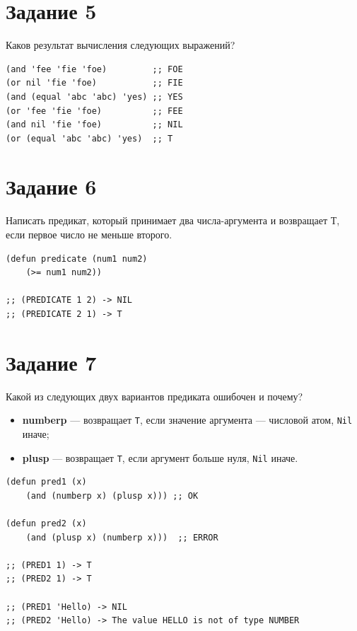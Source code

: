 \documentclass[a4paper,14pt, unknownkeysallowed]{extreport}
\begin{document}
\section{Задание 5}

Каков результат вычисления следующих выражений?

\begin{center}
\captionsetup{justification=raggedright,singlelinecheck=off}
\begin{lstlisting}[label=lst:parallel_processing,caption=Решение задания 5]
(and 'fee 'fie 'foe)         ;; FOE
(or nil 'fie 'foe)           ;; FIE
(and (equal 'abc 'abc) 'yes) ;; YES
(or 'fee 'fie 'foe)          ;; FEE
(and nil 'fie 'foe)          ;; NIL
(or (equal 'abc 'abc) 'yes)  ;; T
\end{lstlisting}
\end{center}

\section{Задание 6}

Написать предикат, который принимает два числа-аргумента и возвращает Т, если первое число не меньше второго.

\begin{center}
\captionsetup{justification=raggedright,singlelinecheck=off}
\begin{lstlisting}[label=lst:parallel_processing,caption=Решение задания 6]
(defun predicate (num1 num2)
    (>= num1 num2))

;; (PREDICATE 1 2) -> NIL
;; (PREDICATE 2 1) -> T
\end{lstlisting}
\end{center}

\section{Задание 7}

Какой из следующих двух вариантов предиката ошибочен и почему?

\begin{itemize}
	\item \textbf{numberp} — возвращает \texttt{T}, если значение аргумента — числовой атом, \texttt{Nil} иначе;
	\item \textbf{plusp} — возвращает \texttt{T}, если аргумент больше нуля, \texttt{Nil} иначе.
\end{itemize}

\begin{center}
\captionsetup{justification=raggedright,singlelinecheck=off}
\begin{lstlisting}[label=lst:parallel_processing,caption=Решение задания 7]
(defun pred1 (x) 
    (and (numberp x) (plusp x))) ;; OK

(defun pred2 (x)
    (and (plusp x) (numberp x)))  ;; ERROR

;; (PRED1 1) -> T
;; (PRED2 1) -> T

;; (PRED1 'Hello) -> NIL
;; (PRED2 'Hello) -> The value HELLO is not of type NUMBER
\end{lstlisting}
\end{center}
\end{document}
